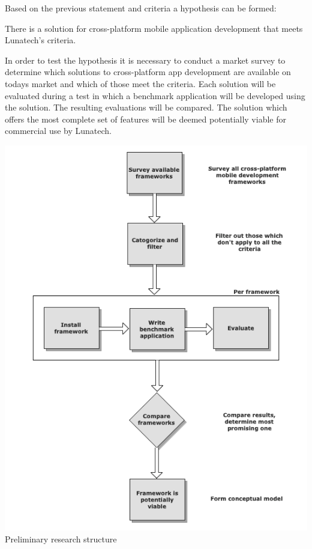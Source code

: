 Based on the previous statement and criteria a hypothesis can be formed:
\begin{shadequote}
There is a solution for cross-platform mobile application development that meets Lunatech's criteria.%
\end{shadequote}

In order to test the hypothesis it is necessary to conduct a market survey to determine which solutions to cross-platform app development are available on todays market and which of those meet the criteria. Each solution will be evaluated during a test in which a benchmark application will be developed using the solution. The resulting evaluations will be compared. The solution which offers the most complete set of features will be deemed potentially viable for commercial use by Lunatech. 

\begin{centering}
\includegraphics[scale=0.6]{images/preliminary}\\{Preliminary research structure}\\
\end{centering}

